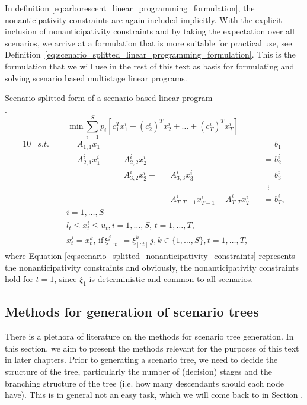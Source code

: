 In definition \ref{eq:arborescent_linear_programming_formulation}, the nonanticipativity constraints are again included implicitly. With the explicit inclusion of nonanticipativity constraints and by taking the expectation over all scenarios, we arrive at a formulation that is more suitable for practical use, see Definition~\ref{eq:scenario_splitted_linear_programming_formulation}. This is the formulation that we will use in the rest of this text as basis for formulating and solving scenario based multistage linear programs.
\begin{defn}
\label{eq:scenario_splitted_linear_programming_formulation}
{Scenario splitted form of a scenario based linear program \\ \cite{defourny_scenario_trees_scenario_splitted_formulation}}.
\footnotesize
\begin{equation*}
\mathrm{min} \, \sum_{i=1}^S p_i \left[ c_1^Tx_1^i + (c_2^i)^Tx_2^i + \dots + (c_T^i)^Tx_T^i  \right] 
\end{equation*}
\vspace{-0.5cm}
\begin{alignat}{10}
& s.t. && \, && A_{1,1}x_1 && && \,&&=b_1 \nonumber \\
& && && A_{2,1}^ix_1^i  + &&A_{2,2}^ix_2^i && &&=b_2^i \nonumber \\
& && && && A_{3,2}^ix_{2}^i  + && A_{3,3}^ix_{3}^i &&=b_3^i \nonumber \\
& && && && && &&  \, \, \, \vdots \nonumber \\
& && && && && A_{T,T-1}^ix_{T-1}^i  +  A_{T,T}^ix_{T}^i &&=b_{T}^i, \nonumber
\end{alignat}
\vspace{-0.5cm}
\begin{align}
\label{eq:scenario_splitted_nonanticipativity_constraints}
& i=1,\dots,S \nonumber \\
& l_t \leq x_{t}^i \leq u_t, i=1,\dots,S, \, t=1,\dots,T,  \nonumber \\
& x_t^j=x_t^k, \, \mathrm{if} \, \xi_{[:t]}^j=\xi_{[:t]}^k \, j,k \in \{1,\dots,S\} , t=1,\dots,T,
\end{align}
\normalsize
where Equation \ref{eq:scenario_splitted_nonanticipativity_constraints} represents the nonanticipativity constraints and obviously, the nonanticipativity constraints hold for $t=1$, since $\xi_1$ is deterministic and common to all scenarios.
\end{defn}
\subsection{Methods for generation of scenario trees}
There is a plethora of literature on the methods for scenario tree generation. In this section, we aim to present the methods relevant for the purposes of this text in later chapters. Prior to generating a scenario tree, we need to decide the structure of the tree, particularly the number of (decision) stages and the branching structure of the tree (i.e. how many descendants should each node have). This is in general not an easy task, which we will come back to in Section .
